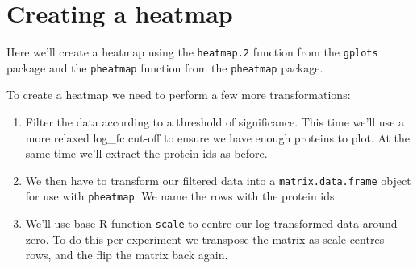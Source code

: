 \documentclass[12pt,]{book}
\newenvironment{Shaded}{\begin{snugshade}}{\end{snugshade}}
\newcommand{\CommentTok}[1]{\textcolor[rgb]{0.56,0.35,0.01}{\textit{#1}}}
\newcommand{\DataTypeTok}[1]{\textcolor[rgb]{0.13,0.29,0.53}{#1}}
\newcommand{\DecValTok}[1]{\textcolor[rgb]{0.00,0.00,0.81}{#1}}
\newcommand{\FloatTok}[1]{\textcolor[rgb]{0.00,0.00,0.81}{#1}}
\newcommand{\KeywordTok}[1]{\textcolor[rgb]{0.13,0.29,0.53}{\textbf{#1}}}
\newcommand{\NormalTok}[1]{#1}
\newcommand{\OperatorTok}[1]{\textcolor[rgb]{0.81,0.36,0.00}{\textbf{#1}}}
\newcommand{\StringTok}[1]{\textcolor[rgb]{0.31,0.60,0.02}{#1}}
\begin{document}
\hypertarget{creating-a-heatmap}{%
\section{Creating a heatmap}\label{creating-a-heatmap}}

Here we'll create a heatmap using the \texttt{heatmap.2} function from the \texttt{gplots}
package and the \texttt{pheatmap} function from the \texttt{pheatmap} package.

To create a heatmap we need to perform a few more transformations:

\begin{enumerate}
\def\labelenumi{\arabic{enumi}.}
\item
  Filter the data according to a threshold of significance. This time we'll use
  a more relaxed log\_fc cut-off to ensure we have enough proteins to plot. At
  the same time we'll extract the protein ids as before.
\item
  We then have to transform our filtered data into a \texttt{matrix.data.frame} object
  for use with \texttt{pheatmap}. We name the rows with the protein ids
\item
  We'll use base R function \texttt{scale} to centre our log transformed data around zero. To do this per experiment we transpose the matrix as scale centres rows,
  and the flip the matrix back again.
\end{enumerate}

\begin{Shaded}
\end{Shaded}
\end{document}
